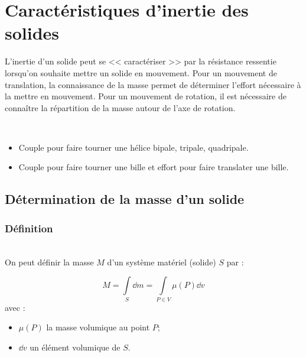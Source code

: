 \documentclass[10pt,fleqn]{article} %
\begin{document}

\setlength{\columnseprule}{.1pt}

\vspace{2cm}
\pagestyle{fancy}
\thispagestyle{plain}




\section{Caractéristiques d'inertie des solides}
L'inertie d'un solide peut se << caractériser >> par la résistance ressentie lorsqu'on souhaite mettre un solide en mouvement. Pour un mouvement de translation, la connaissance de la masse permet de déterminer l'effort nécessaire à la mettre en mouvement. 
Pour un mouvement de rotation, il est nécessaire de connaître la répartition de la masse autour de l'axe de rotation.

\begin{exemple}~\\

\begin{itemize}
\item Couple pour faire tourner une hélice bipale, tripale, quadripale.
\item Couple pour faire tourner une bille et effort pour faire translater une bille.
\end{itemize}
\end{exemple}

\subsection{Détermination de la masse d'un solide}
\subsubsection{Définition}
\begin{defi}~\\
%
On peut définir la masse $M$ d'un système matériel (solide) $S$ par : 
\begin{multicols}{2}
\vspace{-1cm}
$$ M = \int\limits_S \dd m =\int\limits_{P\in V} \mu(P) \dd v $$ 
avec :
\begin{itemize}
\item $\mu(P)$ la masse volumique au point $P$;
\item $\dd v$ un élément volumique de $S$.
\end{itemize}
\end{multicols}
\vspace{.01cm}
\end{defi}
\end{document}
